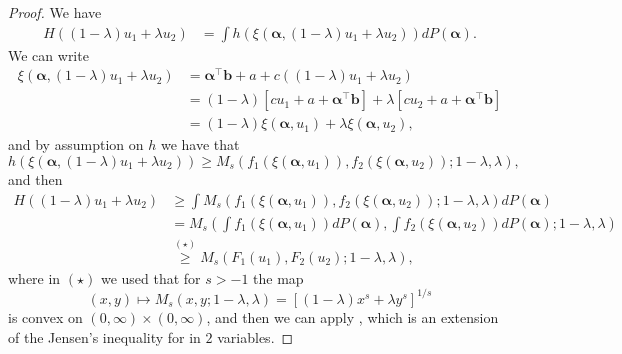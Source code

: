 \documentclass{article} %
\begin{document}
\begin{proof}
We have
$$
\begin{aligned}
H((1-\lambda)u_1+\lambda u_2)
&=\int h(\xi(\boldsymbol{\alpha},(1-\lambda)u_1+\lambda u_2)) dP(\boldsymbol{\alpha}).
\end{aligned}
$$
We can write
\begin{align*}
\xi(\boldsymbol{\alpha},(1-\lambda)u_1+\lambda u_2) &= \boldsymbol{\alpha}^{\top} \mathbf{b} + a + c((1-\lambda)u_1+\lambda u_2)\\
&= (1-\lambda) [cu_1+a+\boldsymbol{\alpha}^{\top}\mathbf{b}] + \lambda [cu_2+a+\boldsymbol{\alpha}^{\top}\mathbf{b}]\\
&= (1-\lambda) \xi(\boldsymbol{\alpha},u_1) + \lambda \xi(\boldsymbol{\alpha},u_2),
\end{align*}
and by assumption on $h$ we have that
$$
h(\xi(\boldsymbol{\alpha},(1-\lambda)u_1+\lambda u_2)) \geq M_s(f_1(\xi(\boldsymbol{\alpha},u_1)),f_2(\xi(\boldsymbol{\alpha},u_2));1-\lambda,\lambda),
$$
and then
$$
\begin{aligned}
H((1-\lambda)u_1+\lambda u_2)&\geq \int M_s(f_1(\xi(\boldsymbol{\alpha},u_1)),f_2(\xi(\boldsymbol{\alpha},u_2));1-\lambda,\lambda) dP(\boldsymbol{\alpha}) \\
& = M_{s}\left(\int f_1(\xi(\boldsymbol{\alpha},u_1)) dP(\boldsymbol{\alpha}), \int f_2(\xi(\boldsymbol{\alpha},u_2)) dP(\boldsymbol{\alpha}) ; 1-\lambda, \lambda\right)\\
&\overset{(\star)}{\geq} M_{s}\left( F_1(u_1), F_2(u_2) ; 1-\lambda, \lambda\right),
\end{aligned}
$$
\noindent
where in $(\star)$ we used that for $s > -1$ the map
$$
(x, y) \mapsto M_s(x, y ; 1-\lambda, \lambda)=\left[(1-\lambda) x^s+\lambda y^s\right]^{1 / s}
$$
is convex on $(0, \infty)\times (0,\infty)$, and then we can apply \citet[Theorem 3.5.3]{niculescu2006convex}, which is an extension of the Jensen's inequality for in $2$ variables.
\end{proof}


\end{document}
